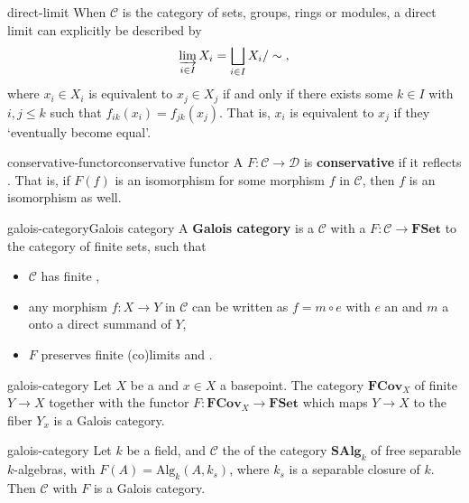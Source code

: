 \begin{example}{direct-limit}
    When $\mathcal{C}$ is the category of sets, groups, rings or modules, a direct limit can     explicitly be described by
    \[ \varinjlim_{i \in I} X_i = \bigsqcup_{i \in I} X_i / \sim{} , \]
    where $x_i \in X_i$ is equivalent to $x_j \in X_j$ if and only if there exists some $k \in I$ with $i, j \le k$ such that $f_{ik}(x_i) = f_{jk}(x_j)$. That is, $x_i$ is equivalent to $x_j$ if they `eventually become equal'.
\end{example}

\begin{topic}{conservative-functor}{conservative functor}
    A  $F : \mathcal{C} \to \mathcal{D}$ is \textbf{conservative} if it reflects . That is, if $F(f)$ is an isomorphism for some morphism $f$ in $\mathcal{C}$, then $f$ is an isomorphism as well.
\end{topic}

\begin{topic}{galois-category}{Galois category}
    A \textbf{Galois category} is a  $\mathcal{C}$ with a  $F : \mathcal{C} \to \textbf{FSet}$ to the category of finite sets, such that
    \begin{itemize}
        \item $\mathcal{C}$ has finite ,
        \item any morphism $f : X \to Y$ in $\mathcal{C}$ can be written as $f = m \circ e$ with $e$ an  and $m$ a  onto a direct summand of $Y$,
        \item $F$ preserves finite (co)limits and .
    \end{itemize}
\end{topic}

\begin{example}{galois-category}
    Let $X$ be a   and $x \in X$ a basepoint. The category $\textbf{FCov}_X$ of finite  $Y \to X$ together with the functor $F : \textbf{FCov}_X \to \textbf{FSet}$ which maps $Y \to X$ to the fiber $Y_x$ is a Galois category.
\end{example}

\begin{example}{galois-category}
    Let $k$ be a field, and $\mathcal{C}$ the  of the category $\textbf{SAlg}_k$ of free separable $k$-algebras, with $F(A) = \text{Alg}_k(A, k_s)$, where $k_s$ is a separable closure of $k$. Then $\mathcal{C}$ with $F$ is a Galois category.
\end{example}

